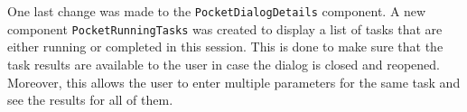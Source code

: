 One last change was made to the \texttt{PocketDialogDetails} component. A new component \texttt{PocketRunningTasks} was created to display a list of tasks that are either running or completed in this session. This is done to make sure that the task results are available to the user in case the dialog is closed and reopened. Moreover, this allows the user to enter multiple parameters for the same task and see the results for all of them.


